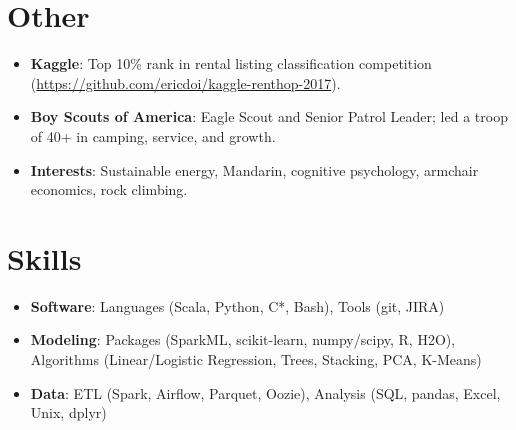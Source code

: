 \documentclass[letterpaper,11pt]{article}
\newcommand{\resumeItem}[2]{
  \item\small{
    \textbf{#1}{: #2 \vspace{-2pt}}
  }
}
\newcommand{\resumeSubItem}[2]{\resumeItem{#1}{#2}\vspace{-4pt}}
\newcommand{\resumeSubHeadingListStart}{\begin{itemize}[leftmargin=*]}
\newcommand{\resumeSubHeadingListEnd}{\end{itemize}}
\begin{document}
\section{Other}
  \resumeSubHeadingListStart
    \resumeSubItem{Kaggle}
      {Top 10\% rank in rental listing classification competition (\href{github.com/ericdoi/kaggle-renthop-2017}{https://github.com/ericdoi/kaggle-renthop-2017}).}
    \resumeSubItem{Boy Scouts of America}
      {Eagle Scout and Senior Patrol Leader; led a troop of 40+ in camping, service, and growth.}
    \resumeSubItem{Interests}
      {Sustainable energy, Mandarin, cognitive psychology, armchair economics, rock climbing.}
  \resumeSubHeadingListEnd


\section{Skills}
  \resumeSubHeadingListStart
    \resumeItem{Software}{Languages (Scala, Python, C*, Bash), Tools (git, JIRA)}
    \resumeItem{Modeling}{Packages (SparkML, scikit-learn, numpy/scipy, R, H2O), Algorithms (Linear/Logistic Regression, Trees, Stacking, PCA, K-Means)}
    \resumeItem{Data}{ETL (Spark, Airflow, Parquet, Oozie), Analysis (SQL, pandas, Excel, Unix, dplyr)}
  \resumeSubHeadingListEnd


\end{document}
